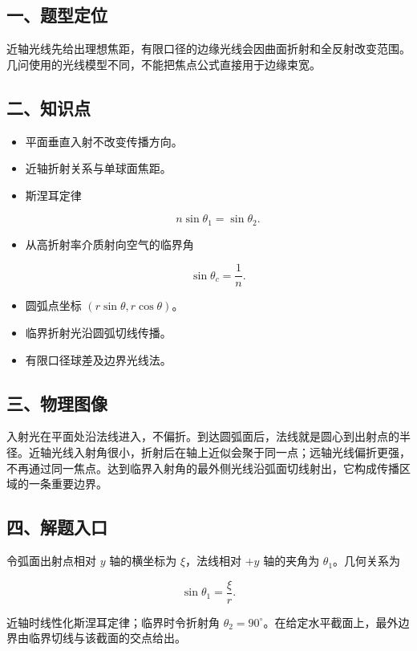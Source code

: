 \documentclass[12pt,a4paper,UTF8]{ctexart}
\begin{document}
\subsection{一、题型定位}\label{ux4e00ux9898ux578bux5b9aux4f4d-6}

近轴光线先给出理想焦距，有限口径的边缘光线会因曲面折射和全反射改变范围。几问使用的光线模型不同，不能把焦点公式直接用于边缘束宽。

\subsection{二、知识点}\label{ux4e8cux77e5ux8bc6ux70b9-6}

\begin{itemize}
\item
  平面垂直入射不改变传播方向。
\item
  近轴折射关系与单球面焦距。
\item
  斯涅耳定律

  \[n\sin\theta_1=\sin\theta_2.\]
\item
  从高折射率介质射向空气的临界角

  \[\sin\theta_c=\frac1n.\]
\item
  圆弧点坐标 \((r\sin\theta,r\cos\theta)\)。
\item
  临界折射光沿圆弧切线传播。
\item
  有限口径球差及边界光线法。
\end{itemize}

\subsection{三、物理图像}\label{ux4e09ux7269ux7406ux56feux50cf-6}

入射光在平面处沿法线进入，不偏折。到达圆弧面后，法线就是圆心到出射点的半径。近轴光线入射角很小，折射后在轴上近似会聚于同一点；远轴光线偏折更强，不再通过同一焦点。达到临界入射角的最外侧光线沿弧面切线射出，它构成传播区域的一条重要边界。

\subsection{四、解题入口}\label{ux56dbux89e3ux9898ux5165ux53e3-6}

令弧面出射点相对 \(y\) 轴的横坐标为 \(\xi\)，法线相对 \(+y\) 轴的夹角为
\(\theta_1\)。几何关系为

\[
\sin\theta_1=\frac\xi r.
\]

近轴时线性化斯涅耳定律；临界时令折射角
\(\theta_2=90^\circ\)。在给定水平截面上，最外边界由临界切线与该截面的交点给出。
\end{document}
